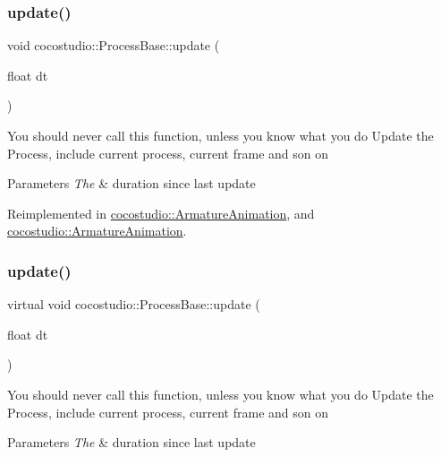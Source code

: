\subsubsection{\texorpdfstring{update()}{update()}\hspace{0.1cm}{\footnotesize\ttfamily [1/2]}}
{\footnotesize\ttfamily void cocostudio\+::\+Process\+Base\+::update (\begin{DoxyParamCaption}\item[{float}]{dt }\end{DoxyParamCaption})\hspace{0.3cm}{\ttfamily [virtual]}}

You should never call this function, unless you know what you do Update the Process, include current process, current frame and son on


\begin{DoxyParams}{Parameters}
{\em The} & duration since last update \\
\hline
\end{DoxyParams}


Reimplemented in \hyperlink{classcocostudio_1_1ArmatureAnimation_a6ae1a77029ac2fe5663d2b997f54b245}{cocostudio\+::\+Armature\+Animation}, and \hyperlink{classcocostudio_1_1ArmatureAnimation_aec1d25a2b9221801e29782b05eb44f42}{cocostudio\+::\+Armature\+Animation}.

\mbox{\label{classcocostudio_1_1ProcessBase_aa58567e485c4ff5f4f9e306816ca6864}} 
\subsubsection{\texorpdfstring{update()}{update()}\hspace{0.1cm}{\footnotesize\ttfamily [2/2]}}
{\footnotesize\ttfamily virtual void cocostudio\+::\+Process\+Base\+::update (\begin{DoxyParamCaption}\item[{float}]{dt }\end{DoxyParamCaption})\hspace{0.3cm}{\ttfamily [virtual]}}

You should never call this function, unless you know what you do Update the Process, include current process, current frame and son on


\begin{DoxyParams}{Parameters}
{\em The} & duration since last update \\
\hline
\end{DoxyParams}


